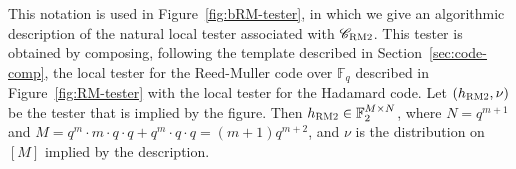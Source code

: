 \documentclass[11pt]{article}
\theoremstyle{definition}
\newcommand{\code}{\mathscr{C}}
\newcommand{\F}{\ensuremath{\mathbb{F}}}
\newcommand{\RM}{\ensuremath{\textsc{RM}}}
\newcommand{\bRM}{\ensuremath{\textsc{RM2}}}
\newcommand{\had}{\textsc{Had}}
\begin{document}
This notation is used in Figure~\ref{fig:bRM-tester}, in which we give an algorithmic description of the natural local tester associated with $\code_{\bRM}$. This tester is obtained by composing, following the template described in Section~\ref{sec:code-comp}, the local tester for the Reed-Muller code over $\F_q$ described in Figure~\ref{fig:RM-tester} with the local tester for the Hadamard code.
Let $(h_\bRM,\nu)$ be the tester that is implied by the figure. Then $h_\bRM\in \F_2^{M\times N}$, where $N=q^{m+1}$ and $M=q^m\cdot m \cdot q \cdot q +  q^{m}\cdot q \cdot q = (m+1)q^{m+2}$, and $\nu$ is the distribution on $[M]$ implied by the description. 


\end{document}
